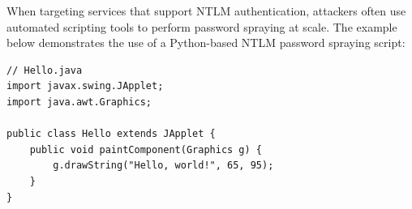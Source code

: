 When targeting services that support NTLM authentication, attackers often use automated scripting tools to perform password spraying at scale. The example below demonstrates the use of a Python-based NTLM password spraying script:
\begin{lstlisting}
// Hello.java
import javax.swing.JApplet;
import java.awt.Graphics;

public class Hello extends JApplet {
    public void paintComponent(Graphics g) {
        g.drawString("Hello, world!", 65, 95);
    }    
}
\end{lstlisting}



















